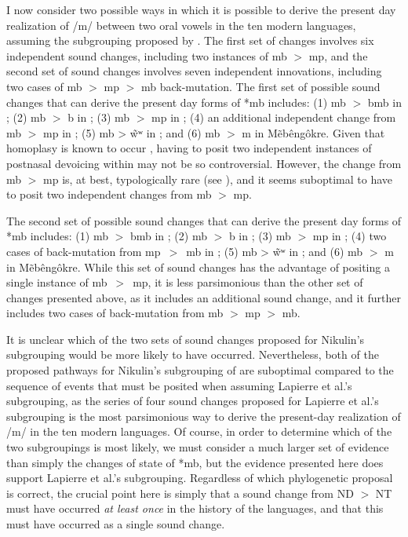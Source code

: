 \documentclass[output=paper,hidelinks]{langscibook}
\begin{document}
\begin{sloppypar}
I now consider two possible ways in which it is possible to derive the present day realization of /m/ between two oral vowels in the ten modern  languages, assuming the subgrouping proposed by \citet{Nikulin2016, Nikulin2017}. The first set of changes involves six independent sound changes, including two instances of mb $>$ mp, and the second set of sound changes involves seven independent innovations, including two cases of mb $>$ mp $>$ mb back-mutation. The first set of possible sound changes that can derive the present day forms of  *mb includes: (1) mb $>$ bmb in ; (2) mb $>$ b in ; (3) mb $>$ mp in ; (4) an additional independent change from mb $>$ mp in ; (5) mb > \~wʷ in ; and (6) mb $>$ m in M\~eb\^eng\^okre. Given that homoplasy is known to occur \citep{Chang2015}, having to posit two independent instances of postnasal devoicing within  may not be so controversial. However, the change from mb $>$ mp is, at best, typologically rare (see ), and it seems suboptimal to have to posit two independent changes from mb $>$ mp. 
\end{sloppypar}

The second set of possible sound changes that can derive the present day forms of  *mb includes: (1) mb $>$ bmb in ; (2) mb $>$ b in ; (3) mb $>$ mp in ; (4) two cases of back-mutation from mp~$>$~mb in ; (5) mb > \~wʷ in ; and (6) mb $>$ m in M\~eb\^eng\^okre. While this set of sound changes has the advantage of positing a single instance of mb~$>$~mp, it is less parsimonious than the other set of changes presented above, as it includes an additional sound change, and it further includes two cases of back-mutation from mb $>$ mp $>$ mb. 

It is unclear which of the two sets of sound changes proposed for Nikulin's subgrouping would be more likely to have occurred. Nevertheless, both of the proposed pathways for Nikulin's subgrouping of  are suboptimal compared to the sequence of events that must be posited when assuming Lapierre et al.'s subgrouping, as the series of four sound changes proposed for Lapierre et al.'s subgrouping is the most parsimonious way to derive the present-day realization of /m/ in the ten modern  languages. Of course, in order to determine which of the two  subgroupings is most likely, we must consider a much larger set of evidence than simply the changes of state of  *mb, but the evidence presented here does support Lapierre et al.'s subgrouping. Regardless of which phylogenetic proposal is correct, the crucial point here is simply that a sound change from ND $>$ NT must have occurred \textit{at least once} in the history of the  languages, and that this must have occurred as a single sound change.
\end{document}
